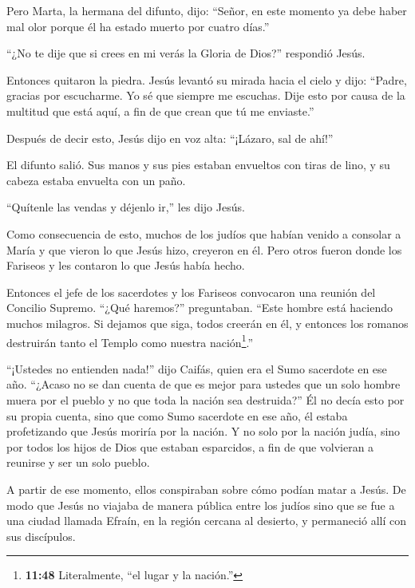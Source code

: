 Pero Marta, la hermana del difunto, dijo: ``Señor, en este momento ya
debe haber mal olor porque él ha estado muerto por cuatro días.''

 ``¿No te dije que si crees en mi verás la Gloria de
Dios?'' respondió Jesús.

 Entonces quitaron la piedra. Jesús levantó su mirada hacia
el cielo y dijo: ``Padre, gracias por escucharme.  Yo sé
que siempre me escuchas. Dije esto por causa de la multitud que está
aquí, a fin de que crean que tú me enviaste.''

 Después de decir esto, Jesús dijo en voz alta: ``¡Lázaro,
sal de ahí!''

 El difunto salió. Sus manos y sus pies estaban envueltos
con tiras de lino, y su cabeza estaba envuelta con un paño.

``Quítenle las vendas y déjenlo ir,'' les dijo Jesús.

 Como consecuencia de esto, muchos de los judíos que habían
venido a consolar a María y que vieron lo que Jesús hizo, creyeron en
él.  Pero otros fueron donde los Fariseos y les contaron lo
que Jesús había hecho.

 Entonces el jefe de los sacerdotes y los Fariseos
convocaron una reunión del Concilio Supremo. ``¿Qué haremos?''
preguntaban. ``Este hombre está haciendo muchos milagros. 
Si dejamos que siga, todos creerán en él, y entonces los romanos
destruirán tanto el Templo como nuestra nación\footnote{\textbf{11:48}
  Literalmente, ``el lugar y la nación.''}.''

 ``¡Ustedes no entienden nada!'' dijo Caifás, quien era el
Sumo sacerdote en ese año.  ``¿Acaso no se dan cuenta de
que es mejor para ustedes que un solo hombre muera por el pueblo y no
que toda la nación sea destruida?''  Él no decía esto por
su propia cuenta, sino que como Sumo sacerdote en ese año, él estaba
profetizando que Jesús moriría por la nación.  Y no solo
por la nación judía, sino por todos los hijos de Dios que estaban
esparcidos, a fin de que volvieran a reunirse y ser un solo pueblo.

 A partir de ese momento, ellos conspiraban sobre cómo
podían matar a Jesús.  De modo que Jesús no viajaba de
manera pública entre los judíos sino que se fue a una ciudad llamada
Efraín, en la región cercana al desierto, y permaneció allí con sus
discípulos.

